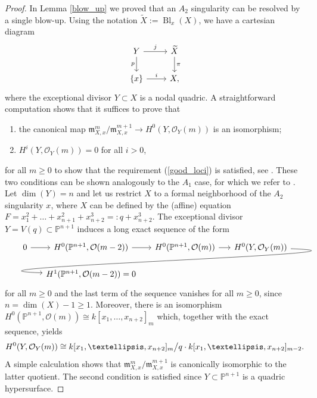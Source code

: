 \documentclass[a4paper, twoside, 11pt]{amsart}
\theoremstyle{definition}
\theoremstyle{remark}
\numberwithin{equation}{theorem}
\DeclareMathOperator{\bl}{Bl}
\begin{document}
\begin{proof}
    In Lemma \ref{blow_up} we proved that an $A_2$ singularity can be resolved by a single blow-up. Using the notation $\widetilde{X} := \bl_x(X)$, we have a cartesian diagram
    \begin{equation*}
	\begin{tikzcd}
		Y \arrow[r, "j"] \arrow[d, "p"'] & \widetilde{X} \arrow[d, "\pi"] \\
		\{x\} \arrow[r, "i"]                         & X,       
	\end{tikzcd}
    \end{equation*}
    where the exceptional divisor $Y\subset X$ is a nodal quadric. A straightforward computation shows that it suffices to prove that
    \begin{enumerate}\label{conditions_pns}
		\item the canonical map $\mathfrak{m}_{X,x}^m/\mathfrak{m}_{X,x}^{m+1} \to H^0(Y,\mathcal{O}_Y(m))$ is an isomorphism;
		\item $H^i(Y, \mathcal{O}_Y(m)) = 0$ for all $i>0$,
	\end{enumerate}
    for all $m\geq 0$ to show that the requirement (\ref{good_loci}) is satisfied, see \cite[Lemma 5.5]{categorical_absorptions}. These two conditions can be shown analogously to the $A_1$ case, for which we refer to \cite[Lemma 5.7]{categorical_absorptions}. Let $\dim(Y) = n$ and let us restrict $X$ to a formal neighborhood of the $A_2$ singularity $x$, where $X$ can be defined by the (affine) equation $F = x_1^2+\dots+x_{n+1}^2+x_{n+2}^{3} =: q +x_{n+2}^3$. The exceptional divisor $Y = V(q) \subset \mathbb{P}^{n+1}$ induces a long exact sequence of the form
	\begin{equation*}
		\begin{tikzcd}[column sep = 0.5cm, row sep = 0.5cm]
        0  \arrow[r] & {H^0(\mathbb{P}^{n+1},\mathcal{O}(m-2))} \arrow[r] & {H^0(\mathbb{P}^{n+1}, \mathcal{O}(m))} \arrow[r] & {H^0(Y, \mathcal{O}_Y(m))} \arrow[out=-2, in=178, looseness=1.3, overlay]{dll} \\
             & {H^1(\mathbb{P}^{n+1}, \mathcal{O}(m-2)) = 0}      &                                                   &              
        \end{tikzcd}
	\end{equation*}
	for all $m \geq 0$ and the last term of the sequence vanishes for all $m\geq 0$, since $n = \dim(X) -1 \geq 1$. Moreover, there is an isomorphism $H^0(\mathbb{P}^{n+1}, \mathcal{O}(m)) \cong k[x_1,\dots,x_{n+2}]_m$ which, together with the exact sequence, yields 
	\begin{equation*}
		H^0(Y, \mathcal{O}_Y(m)) \cong k[x_1,\dots,x_{n+2}]_m\big{/}q \cdot k[x_1,\dots,x_{n+2}]_{m-2}.
	\end{equation*}
	A simple calculation shows that $\mathfrak{m}_{X,x}^m/\mathfrak{m}_{X,x}^{m+1}$ is canonically isomorphic to the latter quotient.
	The second condition is satisfied since $Y \subset \mathbb{P}^{n+1}$ is a quadric hypersurface. 


\end{proof}
\end{document}

